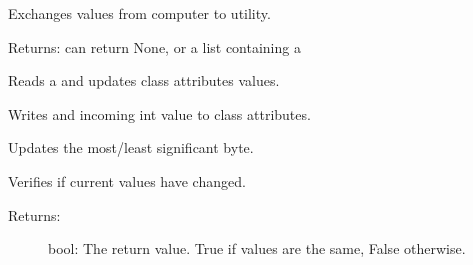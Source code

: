 \documentclass[letterpaper,10pt,english]{sphinxmanual}
\begin{document}
\begin{fulllineitems}
\begin{fulllineitems}
\begin{description}
\end{description}

\end{fulllineitems}


\begin{fulllineitems}
\label{\detokenize{code:reimaginedQuantum.Channel.exchange_values}}
Exchanges values from computer to utility.

Returns: can return None, or a list containing a 

\end{fulllineitems}


\begin{fulllineitems}
\label{\detokenize{code:reimaginedQuantum.Channel.read_value}}
Reads a  and updates class attributes values.

\end{fulllineitems}


\begin{fulllineitems}
\label{\detokenize{code:reimaginedQuantum.Channel.set_value}}
Writes and incoming int value to class attributes.

\end{fulllineitems}


\begin{fulllineitems}
\label{\detokenize{code:reimaginedQuantum.Channel.split_value}}
Updates the most/least significant byte.

\end{fulllineitems}


\begin{fulllineitems}
\label{\detokenize{code:reimaginedQuantum.Channel.verify_values}}
Verifies if current values have changed.
\begin{description}
\item[{Returns:}] \leavevmode
bool: The return value. True if values are the same, False otherwise.

\end{description}

\end{fulllineitems}


\end{fulllineitems}
\end{document}

